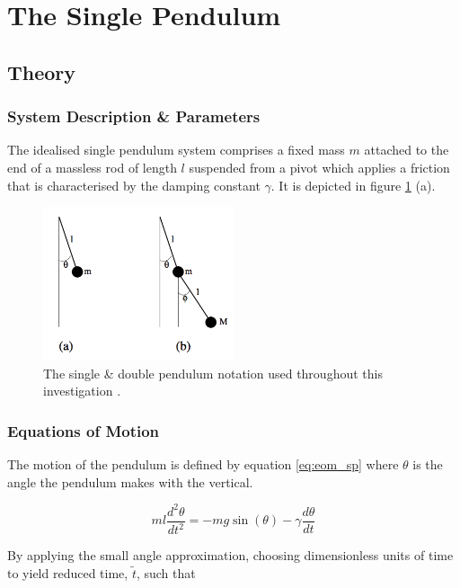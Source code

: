 \documentclass[11pt]{article}
\begin{document}
\section{The Single Pendulum}
\subsection{Theory}
\subsubsection*{System Description \& Parameters}
The idealised single pendulum system comprises a fixed mass $m$ attached to the end of a massless rod of length $l$ suspended from a pivot which applies a friction that is characterised by the damping constant $\gamma$. It is depicted in figure \ref{fig:pendulum_diag} (a).

\begin{figure}[h]
	\begin{center}
		\includegraphics[width=0.5\textwidth]{img/sp_dp_diag.png}
		\caption{The single \& double pendulum notation used throughout this investigation \cite{project outline}.}
		\label{fig:pendulum_diag}
	\end{center}
\end{figure}

\subsubsection*{Equations of Motion}
The motion of the pendulum is defined by equation \ref{eq:eom_sp} where $\theta$ is the angle the pendulum makes with the vertical.

\begin{equation} \label{eq:eom_sp}
	ml\frac{d^2 \theta}{dt^2} = -mg\sin(\theta) - \gamma\frac{d\theta}{dt}
\end{equation}

By applying the small angle approximation, choosing dimensionless units of time to yield reduced time, $\widetilde{t}$, such that
\end{document}
